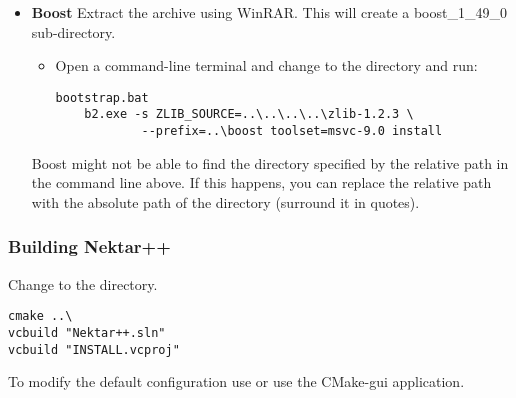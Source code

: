 \begin{itemize}
\item \textbf{Boost} Extract the  archive using
WinRAR. This will create a {{{boost\_1\_49\_0}}} sub-directory.
\begin{itemize}
  \item Open a command-line terminal and change to the 
  directory and run:
    \begin{lstlisting}[style=BashInputStyle]
    bootstrap.bat
    b2.exe -s ZLIB_SOURCE=..\..\..\..\zlib-1.2.3 \ 
            --prefix=..\boost toolset=msvc-9.0 install
    \end{lstlisting}
\end{itemize}
\begin{notebox}
Boost might not be able to find the  directory specified
by the relative path in the command line above. If this happens, you can 
replace the relative path with the absolute path of the \inlsh{zlib-1.2.3}
directory (surround it in quotes).
\end{notebox}
\end{itemize}

\subsubsection{Building Nektar++}
Change to the  directory.
\begin{lstlisting}[style=BashInputStyle]
cmake ..\
vcbuild "Nektar++.sln"
vcbuild "INSTALL.vcproj"
\end{lstlisting}
To modify the default configuration use  or use
the CMake-gui application.


